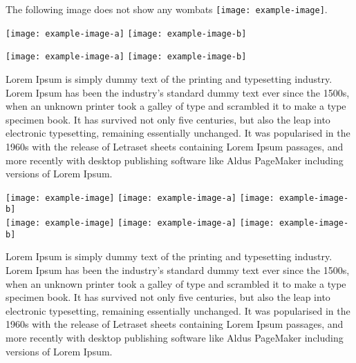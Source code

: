 \documentclass{article}
\begin{document}
The following image does not show any wombats
\texttt{[image: example-image]}.

\vspace{20pt}

\texttt{[image: example-image-a]}
\quad
\texttt{[image: example-image-b]}

\vspace{20pt}

\texttt{[image: example-image-a]}
\quad
\texttt{[image: example-image-b]}

\vspace{20pt}


Lorem Ipsum is simply dummy text of the printing and typesetting industry. Lorem Ipsum has been the industry's standard dummy text ever since the 1500s, when an unknown printer took a galley of type and scrambled it to make a type specimen book. It has survived not only five centuries, but also the leap into electronic typesetting, remaining essentially unchanged. It was popularised in the 1960s with the release of Letraset sheets containing Lorem Ipsum passages, and more recently with desktop publishing software like Aldus PageMaker including versions of Lorem Ipsum.


\newpage

\noindent
\texttt{[image: example-image]}
\quad
\texttt{[image: example-image-a]}
\quad
\texttt{[image: example-image-b]}
\\[\baselineskip]%
\texttt{[image: example-image]}
\quad
\texttt{[image: example-image-a]}
\quad
\texttt{[image: example-image-b]}

\vspace{20pt}

Lorem Ipsum is simply dummy text of the printing and typesetting industry. Lorem Ipsum has been the industry's standard dummy text ever since the 1500s, when an unknown printer took a galley of type and scrambled it to make a type specimen book. It has survived not only five centuries, but also the leap into electronic typesetting, remaining essentially unchanged. It was popularised in the 1960s with the release of Letraset sheets containing Lorem Ipsum passages, and more recently with desktop publishing software like Aldus PageMaker including versions of Lorem Ipsum.
\end{document}

